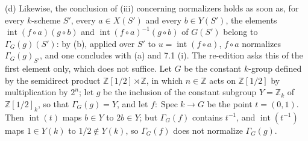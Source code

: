 (d) Likewise, the conclusion of (iii) concerning normalizers holds as soon as, for every \(k\)-scheme
\(S'\), every \(a\in X(S')\) and every \(b\in Y(S')\), the elements
\(\operatorname{int}(f\circ a)(g\circ b)\) and \(\operatorname{int}(f\circ a)^{-1}(g\circ b)\) of
\(G(S')\) belong to \(\Gamma_G(g)(S')\): by (b), applied over \(S'\) to \(u=\operatorname{int}(f\circ a)\),
\(f\circ a\) normalizes \(\Gamma_G(g)_{S'}\), and one concludes with (a) and 7.1 (i). The re-edition
asks this of the first element only, which does not suffice. Let \(G\) be the constant \(k\)-group
defined by the semidirect product \(\mathbb Z[1/2]\rtimes\mathbb Z\), in which \(n\in\mathbb Z\) acts on
\(\mathbb Z[1/2]\) by multiplication by \(2^n\); let \(g\) be the inclusion of the constant subgroup
\(Y=\mathbb Z_k\) of \(\mathbb Z[1/2]_k\), so that \(\Gamma_G(g)=Y\), and let
\(f\colon\operatorname{Spec}k\to G\) be the point \(t=(0,1)\). Then \(\operatorname{int}(t)\) maps
\(b\in Y\) to \(2b\in Y\); but \(\Gamma_G(f)\) contains \(t^{-1}\), and \(\operatorname{int}(t^{-1})\) maps
\(1\in Y(k)\) to \(1/2\notin Y(k)\), so \(\Gamma_G(f)\) does not normalize \(\Gamma_G(g)\).
